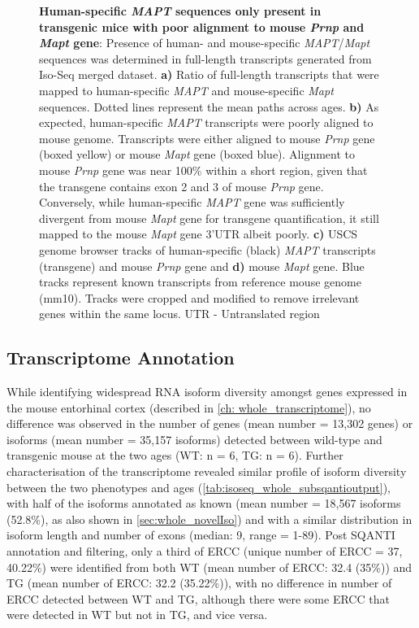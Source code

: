 \begin{figure}[htp]
	{\textbf{Human-specific \textit{MAPT} sequences only present in transgenic mice with poor alignment to mouse \textit{Prnp} and \textit{Mapt} gene}: Presence of human- and mouse-specific \textit{MAPT}/\textit{Mapt} sequences was determined in full-length transcripts generated from Iso-Seq merged dataset. \textbf{a)} Ratio of full-length transcripts that were mapped to human-specific \textit{MAPT} and mouse-specific \textit{Mapt} sequences. Dotted lines represent the mean paths across ages. \textbf{b)} As expected, human-specific \textit{MAPT} transcripts were poorly aligned to mouse genome. Transcripts were either aligned to mouse \textit{Prnp} gene (boxed yellow) or  mouse \textit{Mapt} gene (boxed blue). Alignment to mouse \textit{Prnp} gene was near 100\% within a short region, given that the transgene contains exon 2 and 3 of mouse \textit{Prnp} gene\cite{Ramsden2005}. Conversely, while human-specific \textit{MAPT} gene was sufficiently divergent from mouse \textit{Mapt} gene for transgene quantification, it still mapped to the mouse \textit{Mapt} gene 3'UTR albeit poorly. \textbf{c)} USCS genome browser tracks of human-specific (black) \textit{MAPT} transcripts (transgene) and mouse \textit{Prnp} gene and \textbf{d)} mouse \textit{Mapt} gene. Blue tracks represent known transcripts from reference mouse genome (mm10). Tracks were cropped and modified to remove irrelevant genes within the same locus.  UTR - Untranslated region}
	\label{fig:isoseq_humanmapt}
\end{figure}


\subsection{Transcriptome Annotation}
While identifying widespread RNA isoform diversity amongst genes expressed in the mouse entorhinal cortex (described in \cref{ch: whole_transcriptome}), no difference was observed in the number of genes (mean number = 13,302 genes) or isoforms (mean number = 35,157 isoforms) detected between wild-type and transgenic mouse at the two ages (WT: n = 6, TG: n = 6). Further characterisation of the transcriptome revealed similar profile of isoform diversity between the two phenotypes and ages (\cref{tab:isoseq_whole_subsqantioutput}), with half of the isoforms annotated as known (mean number = 18,567 isoforms (52.8\%), as also shown in \cref{sec:whole_novelIso}) and with a similar distribution in isoform length and number of exons (median: 9, range = 1-89). Post SQANTI annotation and filtering, only a third of ERCC (unique number of ERCC = 37, 40.22\%) were identified from both WT (mean number of ERCC: 32.4 (35\%)) and TG (mean number of ERCC: 32.2 (35.22\%)), with no difference in number of ERCC detected between WT and TG, although there were some ERCC that were detected in WT but not in TG, and vice versa. 

